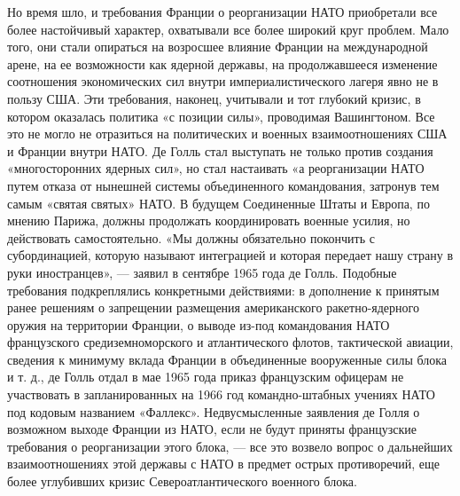 \documentclass[12pt, a4paper, openany]{book}
\begin{document}
		Но время шло, и требования Франции о реорганизации НАТО приобретали все более настойчивый характер, охватывали все более широкий круг проблем. Мало того, они стали опираться на возросшее влияние Франции на международной арене, на ее возможности как ядерной державы, на продолжавшееся изменение соотношения экономических сил внутри империалистического лагеря явно не в пользу США. Эти требования, наконец, учитывали и тот глубокий кризис, в котором оказалась политика «с позиции силы», проводимая Вашингтоном. Все это не могло не отразиться на политических и военных взаимоотношениях США и Франции внутри НАТО. Де Голль стал выступать не только против создания «многосторонних ядерных сил», но стал настаивать «а реорганизации НАТО путем отказа от нынешней системы объединенного командования, затронув тем самым «святая святых» НАТО. В будущем Соединенные Штаты и Европа, по мнению Парижа, должны продолжать координировать военные усилия, но действовать самостоятельно. «Мы должны обязательно покончить с субординацией, которую называют интеграцией и которая передает нашу страну в руки иностранцев», — заявил в сентябре 1965 года де Голль. Подобные требования подкреплялись конкретными действиями: в дополнение к принятым ранее решениям о запрещении размещения американского ракетно-ядерного оружия на территории Франции, о выводе из-под командования НАТО французского средиземноморского и атлантического флотов, тактической авиации, сведения к минимуму вклада Франции в объединенные вооруженные силы блока и т. д., де Голль отдал в мае 1965 года приказ французским офицерам не участвовать в запланированных на 1966 год командно-штабных учениях НАТО под кодовым названием «Фаллекс». Недвусмысленные заявления де Голля о возможном выходе Франции из НАТО, если не будут приняты французские требования о реорганизации этого блока, — все это возвело вопрос о дальнейших взаимоотношениях этой державы с НАТО в предмет острых противоречий, еще более углубивших кризис Североатлантического военного блока.
		
\end{document}
